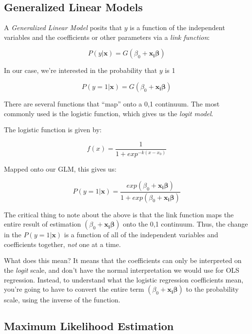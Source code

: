 \documentclass[12pt]{article}
\begin{document}
\subsection{Generalized Linear Models}

A \textit{Generalized Linear Model} posits that $y$ is a function of
the independent variables and the coefficients or other parameters via
a \textit{link function}:

\begin{equation*}
  P(y|\mathbf{x})=G(\beta_0 + \mathbf{x_i\beta})
\end{equation*}

In our case, we're interested in the probability that $y$ is 1

\begin{equation*}
  P(y=1|\mathbf{x})=G(\beta_0 + \mathbf{x_i\beta})
\end{equation*}

There are several functions that ``map'' onto a 0,1 continuum. The
most commonly used is the logistic function, which gives us the
\textit{logit model}.

The logistic function is given by:

\begin{equation*}
  f(x)=\frac{1}{1+exp^{-k(x-x_0)}}
\end{equation*}

Mapped onto our GLM, this gives us: 

\begin{equation*}
  P(y=1|\mathbf{x})=\frac{exp(\beta_0 + \mathbf{x_i\beta})}{1+exp(\beta_0 + \mathbf{x_i\beta})}
\end{equation*}

The critical thing to note about the above is that the link function
maps the entire result of estimation $(\beta_0 + \mathbf{x_i\beta})$
onto the 0,1 continuum. Thus, the change in the $P(y=1|\mathbf{x})$ is
a function of all of the independent variables and coefficients
together, \textit{not} one at a time. 

What does this mean? It means that the coefficients can only be
interpreted on the \textit{logit} scale, and don't have the normal
interpretation we would use for OLS regression. Instead, to understand
what the logistic regression coefficients mean, you're going to have
to convert the entire term $(\beta_0 + \mathbf{x_i\beta})$ to the
probability scale, using the inverse of the function. 

\subsection{Maximum Likelihood Estimation}
\end{document}
